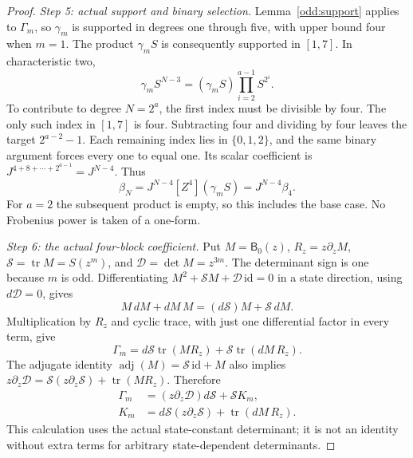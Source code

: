 \begin{proof}
\emph{Step 5: actual support and binary selection.}
Lemma~\ref{odd:support} applies to $\Gamma_m$, so $\gamma_m$
is supported in degrees one through five, with upper bound
four when $m=1$. The product $\gamma_m S$ is consequently
supported in $[1,7]$. In characteristic two,
\[
 \gamma_m S^{N-3}
 = (\gamma_m S)\prod_{i=2}^{a-1}S^{2^i}.
\]
To contribute to degree $N=2^a$, the first index must be
divisible by four. The only such index in $[1,7]$ is four.
Subtracting four and dividing by four leaves the target
$2^{a-2}-1$. Each remaining index lies in $\{0,1,2\}$, and
the same binary argument forces every one to equal one.
Its scalar coefficient is
$J^{4+8+\cdots+2^{a-1}}=J^{N-4}$. Thus
\begin{equation}
 \beta_N=J^{N-4}[Z^4](\gamma_m S)=J^{N-4}\beta_4.
 \label{two:binary-factorisation}
\end{equation}
For $a=2$ the subsequent product is empty, so this includes
the base case. No Frobenius power is taken of a one-form.

\emph{Step 6: the actual four-block coefficient.}
Put $M=\mathsf B_0(z)$, $R_z=z\partial_zM$,
$\mathcal S=\operatorname{tr}M=S(z^m)$, and
$\mathcal D=\det M=z^{3m}$. The determinant sign is one
because $m$ is odd. Differentiating
$M^2+\mathcal SM+\mathcal D\,\mathrm{id}=0$ in a state
direction, using $d\mathcal D=0$, gives
\[
 M\,dM+dM\,M=(d\mathcal S)M+\mathcal S\,dM.
\]
Multiplication by $R_z$ and cyclic trace, with just one
differential factor in every term, give
\[
 \Gamma_m=d\mathcal S\operatorname{tr}(MR_z)
                +\mathcal S\operatorname{tr}(dM\,R_z).
\]
The adjugate identity $\operatorname{adj}(M)=\mathcal S\,\mathrm{id}+M$
also implies
$z\partial_z\mathcal D=\mathcal S(z\partial_z\mathcal S)
 +\operatorname{tr}(MR_z)$. Therefore
\begin{equation}
 \begin{split}
 \Gamma_m&=(z\partial_z\mathcal D)d\mathcal S+\mathcal S K_m,\\
 K_m&=d\mathcal S(z\partial_z\mathcal S)
                         +\operatorname{tr}(dM\,R_z).
 \end{split}
 \label{two:gamma-identity}
\end{equation}
This calculation uses the actual state-constant determinant;
it is not an identity without extra terms for arbitrary
state-dependent determinants.


\end{proof}
